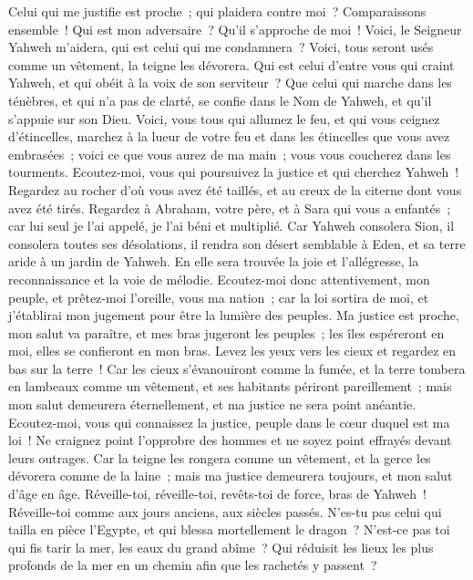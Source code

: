 \begin{multicols}{2}
Celui qui me justifie est proche~; qui plaidera contre moi~? Comparaissons ensemble~! Qui est mon adversaire~? Qu'il s'approche de moi~!
Voici, le Seigneur Yahweh m'aidera, qui est celui qui me condamnera~? Voici, tous seront usés comme un vêtement, la teigne les dévorera.
Qui est celui d'entre vous qui craint Yahweh, et qui obéit à la voix de son serviteur~? Que celui qui marche dans les ténèbres, et qui n'a pas de clarté, se confie dans le Nom de Yahweh, et qu'il s'appuie sur son Dieu.
Voici, vous tous qui allumez le feu, et qui vous ceignez d'étincelles, marchez à la lueur de votre feu et dans les étincelles que vous avez embrasées~; voici ce que vous aurez de ma main~; vous vous coucherez dans les tourments.
\VerseOne{}Ecoutez-moi, vous qui poursuivez la justice et qui cherchez Yahweh~! Regardez au rocher d'où vous avez été taillés, et au creux de la citerne dont vous avez été tirés.
Regardez à Abraham, votre père, et à Sara qui vous a enfantés~; car lui seul je l'ai appelé, je l'ai béni et multiplié.
Car Yahweh consolera Sion, il consolera toutes ses désolations, il rendra son désert semblable à Eden, et sa terre aride à un jardin de Yahweh. En elle sera trouvée la joie et l'allégresse, la reconnaissance et la voie de mélodie.
Ecoutez-moi donc attentivement, mon peuple, et prêtez-moi l'oreille, vous ma nation~; car la loi sortira de moi, et j'établirai mon jugement pour être la lumière des peuples.
Ma justice est proche, mon salut va paraître, et mes bras jugeront les peuples~; les îles espéreront en moi, elles se confieront en mon bras.
Levez les yeux vers les cieux et regardez en bas sur la terre~! Car les cieux s'évanouiront comme la fumée, et la terre tombera en lambeaux comme un vêtement, et ses habitants périront pareillement~; mais mon salut demeurera éternellement, et ma justice ne sera point anéantie.
Ecoutez-moi, vous qui connaissez la justice, peuple dans le cœur duquel est ma loi~! Ne craignez point l'opprobre des hommes et ne soyez point effrayés devant leurs outrages.
Car la teigne les rongera comme un vêtement, et la gerce les dévorera comme de la laine~; mais ma justice demeurera toujours, et mon salut d'âge en âge.
Réveille-toi, réveille-toi, revêts-toi de force, bras de Yahweh~! Réveille-toi comme aux jours anciens, aux siècles passés. N'es-tu pas celui qui tailla en pièce l'Egypte, et qui blessa mortellement le dragon~?
N'est-ce pas toi qui fis tarir la mer, les eaux du grand abîme~? Qui réduisit les lieux les plus profonds de la mer en un chemin afin que les rachetés y passent~?

\end{multicols}
